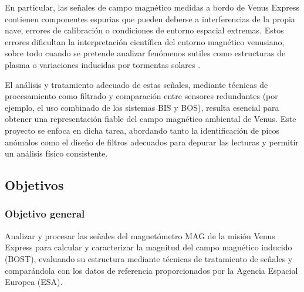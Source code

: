 \documentclass[letterpaper,11pt]{article}
\begin{document}
            En particular, las señales de campo magnético medidas a bordo de Venus Express contienen componentes espurias que pueden deberse a interferencias de la propia nave, errores de calibración o condiciones de entorno espacial extremas. Estos errores dificultan la interpretación científica del entorno magnético venusiano, sobre todo cuando se pretende analizar fenómenos sutiles como estructuras de plasma o variaciones inducidas por tormentas solares \cite{esa}.

            El análisis y tratamiento adecuado de estas señales, mediante técnicas de procesamiento como filtrado y comparación entre sensores redundantes (por ejemplo, el uso combinado de los sistemas BIS y BOS), resulta esencial para obtener una representación fiable del campo magnético ambiental de Venus. Este proyecto se enfoca en dicha tarea, abordando tanto la identificación de picos anómalos como el diseño de filtros adecuados para depurar las lecturas y permitir un análisis físico consistente.

        \subsection{Objetivos}
            \subsubsection{Objetivo general}

            Analizar y procesar las señales del magnetómetro MAG de la misión Venus Express para calcular y caracterizar la magnitud del campo magnético inducido (BOST), evaluando su estructura mediante técnicas de tratamiento de señales y comparándola con los datos de referencia proporcionados por la Agencia Espacial Europea (ESA).
            
        
\end{document}
